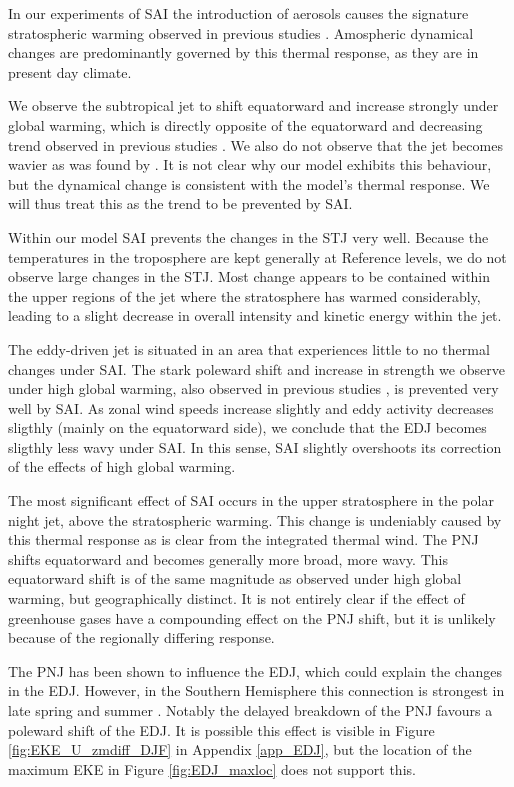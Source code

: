 In our experiments of SAI the introduction of aerosols causes the signature stratospheric warming observed in previous studies \parencite{Ammann2010,bednarz2023climate}. Amospheric dynamical changes are predominantly governed by this thermal response, as they are in present day climate.

We observe the subtropical jet to shift equatorward and increase strongly under global warming, which is directly opposite of the equatorward and decreasing trend observed in previous studies \parencite{chenoli2017historical}. We also do not observe that the jet becomes wavier as was found by \textcite{martin2023}. It is not clear why our model exhibits this behaviour, but the dynamical change is consistent with the model's thermal response. We will thus treat this as the trend to be prevented by SAI. 

Within our model SAI prevents the changes in the STJ very well. Because the temperatures in the troposphere are kept generally at Reference levels, we do not observe large changes in the STJ. Most change appears to be contained within the upper regions of the jet where the stratosphere has warmed considerably, leading to a slight decrease in overall intensity and kinetic energy within the jet. 

The eddy-driven jet is situated in an area that experiences little to no thermal changes under SAI. The stark poleward shift and increase in strength we observe under high global warming, also observed in previous studies \parencite{Curtis_2020}, is prevented very well by SAI. As zonal wind speeds increase slightly and eddy activity decreases sligthly (mainly on the equatorward side), we conclude that the EDJ becomes sligthly less wavy under SAI. In this sense, SAI slightly overshoots its correction of the effects of high global warming. 

The most significant effect of SAI occurs in the upper stratosphere in the polar night jet, above the stratospheric warming. This change is undeniably caused by this thermal response as is clear from the integrated thermal wind. The PNJ shifts equatorward and becomes generally more broad, more wavy. This equatorward shift is of the same magnitude as observed under high global warming, but geographically distinct. It is not entirely clear if the effect of greenhouse gases have a compounding effect on the PNJ shift, but it is unlikely because of the regionally differing response. 

The PNJ has been shown to influence the EDJ, which could explain the changes in the EDJ. However, in the Southern Hemisphere this connection is strongest in late spring and summer \parencite{ceppi2019}. Notably the delayed breakdown of the PNJ favours a poleward shift of the EDJ. It is possible this effect is visible in Figure \ref{fig:EKE_U_zmdiff_DJF} in Appendix \ref{app_EDJ}, but the location of the maximum EKE in Figure \ref{fig:EDJ_maxloc} does not support this. 

